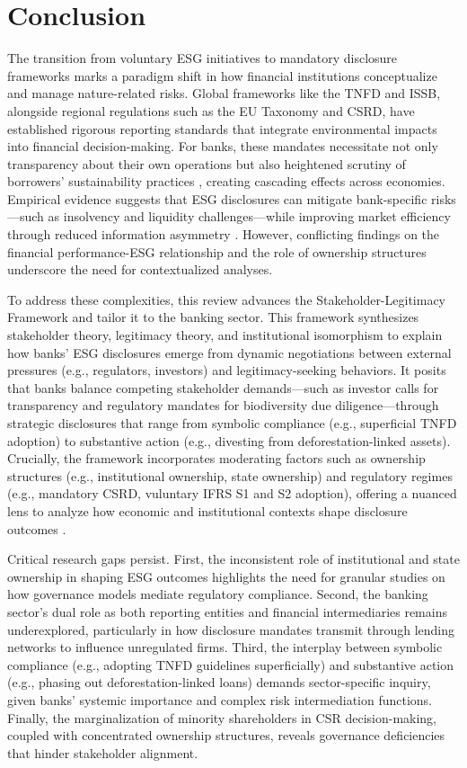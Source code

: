 \documentclass[
  authoryear]{elsarticle}
\begin{document}
\section{Conclusion}\label{conclusion}

The transition from voluntary ESG initiatives to mandatory disclosure
frameworks marks a paradigm shift in how financial institutions
conceptualize and manage nature-related risks. Global frameworks like
the TNFD and ISSB, alongside regional regulations such as the EU
Taxonomy and CSRD, have established rigorous reporting standards that
integrate environmental impacts into financial decision-making. For
banks, these mandates necessitate not only transparency about their own
operations but also heightened scrutiny of borrowers' sustainability
practices \citep[see][]{WANG2023}, creating cascading effects across
economies. Empirical evidence suggests that ESG disclosures can mitigate
bank-specific risks---such as insolvency and liquidity
challenges---while improving market efficiency through reduced
information asymmetry \citep{GANGI2019, SCHOLTENS2019, GANGWANI2024}.
However, conflicting findings on the financial performance-ESG
relationship and the role of ownership structures underscore the need
for contextualized analyses.

To address these complexities, this review advances the
Stakeholder-Legitimacy Framework and tailor it to the banking sector.
This framework synthesizes stakeholder theory, legitimacy theory, and
institutional isomorphism to explain how banks' ESG disclosures emerge
from dynamic negotiations between external pressures (e.g., regulators,
investors) and legitimacy-seeking behaviors. It posits that banks
balance competing stakeholder demands---such as investor calls for
transparency and regulatory mandates for biodiversity due
diligence---through strategic disclosures that range from symbolic
compliance (e.g., superficial TNFD adoption) to substantive action
(e.g., divesting from deforestation-linked assets). Crucially, the
framework incorporates moderating factors such as ownership structures
(e.g., institutional ownership, state ownership) and regulatory regimes
(e.g., mandatory CSRD, vuluntary IFRS S1 and S2 adoption), offering a
nuanced lens to analyze how economic and institutional contexts shape
disclosure outcomes \citep{CAMPBELL2007, AGUINIS2012}.

Critical research gaps persist. First, the inconsistent role of
institutional and state ownership in shaping ESG outcomes highlights the
need for granular studies on how governance models mediate regulatory
compliance. Second, the banking sector's dual role as both reporting
entities and financial intermediaries remains underexplored,
particularly in how disclosure mandates transmit through lending
networks to influence unregulated firms. Third, the interplay between
symbolic compliance (e.g., adopting TNFD guidelines superficially) and
substantive action (e.g., phasing out deforestation-linked loans)
demands sector-specific inquiry, given banks' systemic importance and
complex risk intermediation functions. Finally, the marginalization of
minority shareholders in CSR decision-making, coupled with concentrated
ownership structures, reveals governance deficiencies that hinder
stakeholder alignment.
\end{document}

